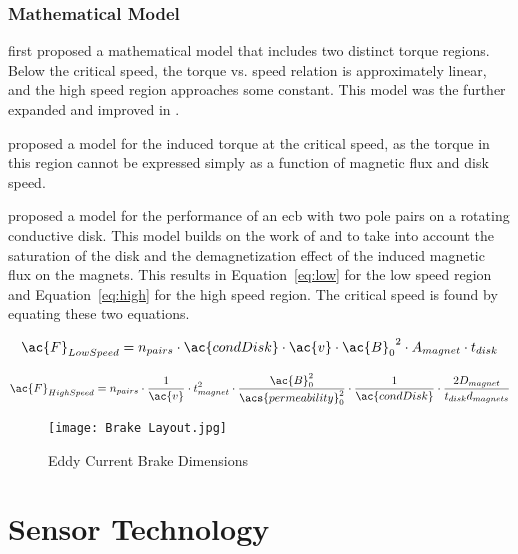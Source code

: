 \subsubsection{Mathematical Model}

\cite{Smythe:1942} first proposed a mathematical model that includes two distinct torque regions. Below the critical speed, the torque vs. speed relation is approximately linear, and the high speed region approaches some constant. This model was the further expanded and improved in \cite{Smythe:1950}.

\cite{Wouterse:1991} proposed a model for the induced torque at the critical speed, as the torque in this region cannot be expressed simply as a function of magnetic flux and disk speed. 

\cite{Baum:2016} proposed a model for the performance of an \ac{ecb} with two pole pairs on a rotating conductive disk. This model builds on the work of \cite{Smythe:1950} and \cite{Wouterse:1991} to take into account the saturation of the disk and the demagnetization effect of the induced magnetic flux on the magnets. This results in Equation~\ref{eq:low} for the low speed region and Equation~\ref{eq:high} for the high speed region. The critical speed is found by equating these two equations.

\begin{equation}
	\ac{F}_{Low Speed} = n_{pairs} \cdot \ac{condDisk} \cdot \ac{v} \cdot {\ac{B}_0}^2 \cdot A_{magnet} \cdot t_{disk}
	\label{eq:low}
\end{equation}

\begin{equation}
	\ac{F}_{High Speed} = n_{pairs} \cdot \frac{1}{\ac{v}} \cdot t_{magnet}^2 \cdot \frac{\ac{B}_0^2}{\acs{permeability}_0^2} \cdot \frac{1}{\ac{condDisk}} \cdot \frac{2 D_{magnet}}{t_{disk} d_{magnets}}
	\label{eq:high}
\end{equation}

\begin{figure}[H]
	\begin{center}
		\texttt{[image: Brake Layout.jpg]}
		\caption{Eddy Current Brake Dimensions}
		\label{fig:EB}
	\end{center}
\end{figure}

\newpage

\section{Sensor Technology}

\newpage

